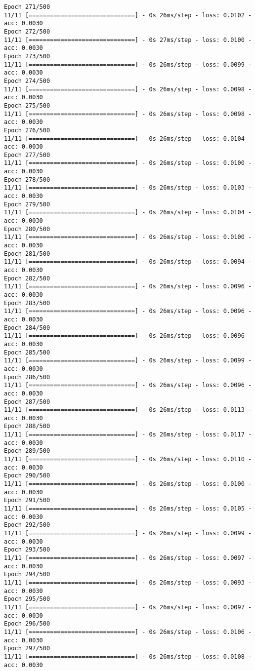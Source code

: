 \documentclass[11pt]{article}
\begin{document}
\begin{Verbatim}[commandchars=\\\{\}]
Epoch 271/500
11/11 [==============================] - 0s 26ms/step - loss: 0.0102 - acc: 0.0030
Epoch 272/500
11/11 [==============================] - 0s 27ms/step - loss: 0.0100 - acc: 0.0030
Epoch 273/500
11/11 [==============================] - 0s 26ms/step - loss: 0.0099 - acc: 0.0030
Epoch 274/500
11/11 [==============================] - 0s 26ms/step - loss: 0.0098 - acc: 0.0030
Epoch 275/500
11/11 [==============================] - 0s 26ms/step - loss: 0.0098 - acc: 0.0030
Epoch 276/500
11/11 [==============================] - 0s 26ms/step - loss: 0.0104 - acc: 0.0030
Epoch 277/500
11/11 [==============================] - 0s 26ms/step - loss: 0.0100 - acc: 0.0030
Epoch 278/500
11/11 [==============================] - 0s 26ms/step - loss: 0.0103 - acc: 0.0030
Epoch 279/500
11/11 [==============================] - 0s 26ms/step - loss: 0.0104 - acc: 0.0030
Epoch 280/500
11/11 [==============================] - 0s 26ms/step - loss: 0.0100 - acc: 0.0030
Epoch 281/500
11/11 [==============================] - 0s 26ms/step - loss: 0.0094 - acc: 0.0030
Epoch 282/500
11/11 [==============================] - 0s 26ms/step - loss: 0.0096 - acc: 0.0030
Epoch 283/500
11/11 [==============================] - 0s 26ms/step - loss: 0.0096 - acc: 0.0030
Epoch 284/500
11/11 [==============================] - 0s 26ms/step - loss: 0.0096 - acc: 0.0030
Epoch 285/500
11/11 [==============================] - 0s 26ms/step - loss: 0.0099 - acc: 0.0030
Epoch 286/500
11/11 [==============================] - 0s 26ms/step - loss: 0.0096 - acc: 0.0030
Epoch 287/500
11/11 [==============================] - 0s 26ms/step - loss: 0.0113 - acc: 0.0030
Epoch 288/500
11/11 [==============================] - 0s 26ms/step - loss: 0.0117 - acc: 0.0030
Epoch 289/500
11/11 [==============================] - 0s 26ms/step - loss: 0.0110 - acc: 0.0030
Epoch 290/500
11/11 [==============================] - 0s 26ms/step - loss: 0.0100 - acc: 0.0030
Epoch 291/500
11/11 [==============================] - 0s 26ms/step - loss: 0.0105 - acc: 0.0030
Epoch 292/500
11/11 [==============================] - 0s 26ms/step - loss: 0.0099 - acc: 0.0030
Epoch 293/500
11/11 [==============================] - 0s 26ms/step - loss: 0.0097 - acc: 0.0030
Epoch 294/500
11/11 [==============================] - 0s 26ms/step - loss: 0.0093 - acc: 0.0030
Epoch 295/500
11/11 [==============================] - 0s 26ms/step - loss: 0.0097 - acc: 0.0030
Epoch 296/500
11/11 [==============================] - 0s 26ms/step - loss: 0.0106 - acc: 0.0030
Epoch 297/500
11/11 [==============================] - 0s 26ms/step - loss: 0.0108 - acc: 0.0030

\end{Verbatim}
\end{document}
